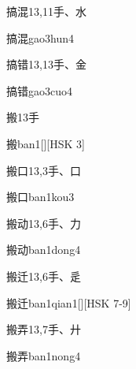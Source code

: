 \begin{Entry}{搞混}{13,11}{⼿、⽔}
  \begin{Phonetics}{搞混}{gao3hun4}
  \end{Phonetics}
\end{Entry}

\begin{Entry}{搞错}{13,13}{⼿、⾦}
  \begin{Phonetics}{搞错}{gao3cuo4}
  \end{Phonetics}
\end{Entry}

\begin{Entry}{搬}{13}{⼿}
  \begin{Phonetics}{搬}{ban1}[][HSK 3]
  \end{Phonetics}
\end{Entry}

\begin{Entry}{搬口}{13,3}{⼿、⼝}
  \begin{Phonetics}{搬口}{ban1kou3}
  \end{Phonetics}
\end{Entry}

\begin{Entry}{搬动}{13,6}{⼿、⼒}
  \begin{Phonetics}{搬动}{ban1dong4}
  \end{Phonetics}
\end{Entry}

\begin{Entry}{搬迁}{13,6}{⼿、⾡}
  \begin{Phonetics}{搬迁}{ban1qian1}[][HSK 7-9]
  \end{Phonetics}
\end{Entry}

\begin{Entry}{搬弄}{13,7}{⼿、⼶}
  \begin{Phonetics}{搬弄}{ban1nong4}
  \end{Phonetics}
\end{Entry}


